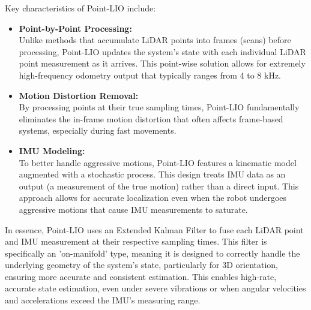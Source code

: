             Key characteristics of \ac{Point-LIO} include:
            \begin{itemize}
                \item \textbf{Point-by-Point Processing: } \\
                    Unlike methods that accumulate LiDAR points into frames (scans) before processing, \ac{Point-LIO} updates the system's state with each individual \ac{LiDAR} point measurement as it arrives. 
                    This point-wise solution allows for extremely high-frequency odometry output that typically ranges from 4 to 8 kHz.
                \item \textbf{Motion Distortion Removal: } \\ 
                    By processing points at their true sampling times, \ac{Point-LIO} fundamentally eliminates the in-frame motion distortion that often affects frame-based systems, especially during fast movements.
                \item \textbf{IMU Modeling:} \\
                    To better handle aggressive motions, \ac{Point-LIO} features a kinematic model augmented with a stochastic process. 
                    This design treats \ac{IMU} data as an output (a measurement of the true motion) rather than a direct input.
                    This approach allows for accurate localization even when the robot undergoes aggressive motions that cause \ac{IMU} measurements to saturate.
            \end{itemize}
            In essence, \ac{Point-LIO} uses an Extended Kalman Filter to fuse each \ac{LiDAR} point and \ac{IMU} measurement at their respective sampling times. 
            This filter is specifically an 'on-manifold' type, meaning it is designed to correctly handle the underlying geometry of the system's state, particularly for 3D orientation, ensuring more accurate and consistent estimation. 
            This enables high-rate, accurate state estimation, even under severe vibrations or when angular velocities and accelerations exceed the \ac{IMU}'s measuring range.

